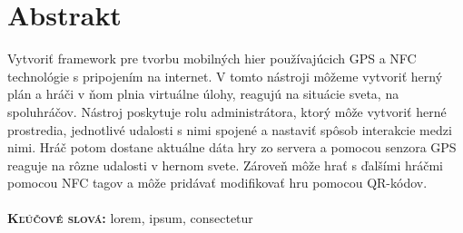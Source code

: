 \chapter{Abstrakt}
Vytvoriť framework pre tvorbu mobilných hier používajúcich GPS a NFC technológie s pripojením na internet. V tomto nástroji môžeme vytvoriť herný plán a hráči v ňom plnia virtuálne úlohy, reagujú na situácie sveta, na spoluhráčov. Nástroj poskytuje rolu administrátora, ktorý môže vytvoriť herné prostredia, jednotlivé udalosti s nimi spojené a nastaviť spôsob interakcie medzi nimi. Hráč potom dostane aktuálne dáta hry zo servera a pomocou senzora GPS reaguje na rôzne udalosti v hernom svete. Zároveň môže hrať s ďalšími hráčmi pomocou NFC tagov a môže pridávať modifikovať hru pomocou QR-kódov.\\ \\
\textbf{\textsc{Kľúčové slová:}} lorem, ipsum, consectetur
